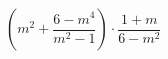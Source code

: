 \begin{ex}[type=expression]
	\begin{condition}
		\( \left( m^2+\dfrac{6-m^4}{m^2-1} \right) \cdot\dfrac{1+m}{6-m^2}\)
	\end{condition}
\end{ex}